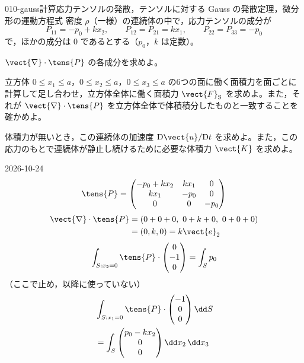 \documentclass[uplatex,dvipdfmx,a4paper,11pt]{jsarticle}
\begin{document}
\begin{mondai}{010-gauss}{計算}{応力テンソルの発散，テンソルに対する Gauss の発散定理，微分形の運動方程式}
密度 $\rho$（一様）の連続体の中で，応力テンソルの成分が
\[ P_{11}=-p_0+kx_2,\qquad P_{12}=P_{21}=kx_1,\qquad P_{22}=P_{33}=-p_0 \]
で，ほかの成分は $0$ であるとする（$p_0$，$k$ は定数）。
\begin{shoumon}
  \item $\vect{\nabla}\cdot\tens{P}$ の各成分を求めよ。
  \item 立方体 $0\le x_1\le a$，$0\le x_2\le a$，$0\le x_3\le a$ の6つの面に働く面積力を面ごとに計算して足し合わせ，立方体全体に働く面積力 $\vect{F}_{\mathrm{S}}$ を求めよ。また，それが $\vect{\nabla}\cdot\tens{P}$ を立方体全体で体積積分したものと一致することを確かめよ。
  \item 体積力が無いとき，この連続体の加速度 $\mathrm{D}\vect{u}/\mathrm{D}t$ を求めよ。また，この応力のもとで連続体が静止し続けるために必要な体積力 $\vect{K}$ を求めよ。
\end{shoumon}
\begin{kotaeutsushi}{2026-10-24}
\[ \tens{P}=\begin{pmatrix}-p_{0}+kx_{2}&kx_{1}&0\\kx_{1}&-p_{0}&0\\0&0&-p_{0}\end{pmatrix} \]
\begin{align*}
\vect{\nabla}\cdot\tens{P}&=(0+0+0,\ 0+k+0,\ 0+0+0)\\
&=(0,k,0)=k\vect{e}_{2}
\end{align*}
\[ \int_{S:x_{2}=0}\tens{P}\cdot\begin{pmatrix}0\\-1\\0\end{pmatrix}=\int_{S}p_{0} \]
（ここで止め，以降に使っていない）
\begin{align*}
&\int_{S:x_{1}=0}\tens{P}\cdot\begin{pmatrix}-1\\0\\0\end{pmatrix}\dd S\\
&=\int_{S}\begin{pmatrix}p_{0}-kx_{2}\\0\\0\end{pmatrix}\dd x_{2}\,\dd x_{3}\\

\end{align*}
\end{kotaeutsushi}
\end{mondai}
\end{document}
